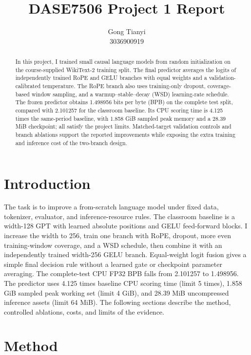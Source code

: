 \documentclass[10pt,a4paper]{article}
\title{DASE7506 Project 1 Report}
\author{Gong Tianyi\\ 3036900919}
\date{}
\begin{document}
\maketitle
\vspace{-2em}

\begin{abstract}
In this project, I trained small causal language models from random initialization on the course-supplied WikiText-2 training split. The final predictor averages the logits of independently trained RoPE and GELU branches with equal weights and a validation-calibrated temperature. The RoPE branch also uses training-only dropout, coverage-based window sampling, and a warmup--stable--decay (WSD) learning-rate schedule. The frozen predictor obtains 1.498956 bits per byte (BPB) on the complete test split, compared with 2.101257 for the classroom baseline. Its CPU scoring time is 4.125 times the same-period baseline, with 1.858 GiB sampled peak memory and a 28.39 MiB checkpoint; all satisfy the project limits. Matched-target validation controls and branch ablations support the reported improvements while exposing the extra training and inference cost of the two-branch design.
\end{abstract}

\section{Introduction}
The task is to improve a from-scratch language model under fixed data, tokenizer, evaluator, and inference-resource rules. The classroom baseline is a width-128 GPT with learned absolute positions and GELU feed-forward blocks. I increase the width to 256, train one branch with RoPE, dropout, more even training-window coverage, and a WSD schedule, then combine it with an independently trained width-256 GELU branch. Equal-weight logit fusion gives a simple final decision rule without a learned gate or checkpoint parameter averaging. The complete-test CPU FP32 BPB falls from 2.101257 to 1.498956. The predictor uses 4.125 times baseline CPU scoring time (limit 5 times), 1.858 GiB sampled peak working set (limit 4 GiB), and 28.39 MiB uncompressed inference assets (limit 64 MiB). The following sections describe the method, controlled ablations, costs, and limits of the evidence.

\section{Method}
\end{document}
